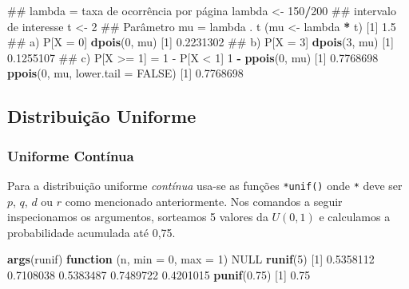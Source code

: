\documentclass[10pt,a4paper]{book}
\newenvironment{Shaded}{\begin{snugshade}}{\end{snugshade}}
\newcommand{\KeywordTok}[1]{\textcolor[rgb]{0.13,0.29,0.53}{\textbf{#1}}}
\newcommand{\DataTypeTok}[1]{\textcolor[rgb]{0.13,0.29,0.53}{#1}}
\newcommand{\DecValTok}[1]{\textcolor[rgb]{0.00,0.00,0.81}{#1}}
\newcommand{\FloatTok}[1]{\textcolor[rgb]{0.00,0.00,0.81}{#1}}
\newcommand{\StringTok}[1]{\textcolor[rgb]{0.31,0.60,0.02}{#1}}
\newcommand{\OtherTok}[1]{\textcolor[rgb]{0.56,0.35,0.01}{#1}}
\newcommand{\ControlFlowTok}[1]{\textcolor[rgb]{0.13,0.29,0.53}{\textbf{#1}}}
\newcommand{\OperatorTok}[1]{\textcolor[rgb]{0.81,0.36,0.00}{\textbf{#1}}}
\newcommand{\NormalTok}[1]{#1}
\begin{document}
\begin{Shaded}
\begin{Highlighting}[]
\NormalTok{## lambda = taxa de ocorrência por página}
\NormalTok{lambda <-}\StringTok{ }\DecValTok{150}\OperatorTok{/}\DecValTok{200}
\NormalTok{## intervalo de interesse}
\NormalTok{t <-}\StringTok{ }\DecValTok{2}
\NormalTok{## Parâmetro mu = lambda . t}
\NormalTok{(mu <-}\StringTok{ }\NormalTok{lambda }\OperatorTok{*}\StringTok{ }\NormalTok{t)}
\NormalTok{[}\DecValTok{1}\NormalTok{] }\FloatTok{1.5}
\NormalTok{## a) P[X = 0]}
\KeywordTok{dpois}\NormalTok{(}\DecValTok{0}\NormalTok{, mu)}
\NormalTok{[}\DecValTok{1}\NormalTok{] }\FloatTok{0.2231302}
\NormalTok{## b) P[X = 3]}
\KeywordTok{dpois}\NormalTok{(}\DecValTok{3}\NormalTok{, mu)}
\NormalTok{[}\DecValTok{1}\NormalTok{] }\FloatTok{0.1255107}
\NormalTok{## c) P[X >= 1] = 1 - P[X < 1]}
\DecValTok{1} \OperatorTok{-}\StringTok{ }\KeywordTok{ppois}\NormalTok{(}\DecValTok{0}\NormalTok{, mu)}
\NormalTok{[}\DecValTok{1}\NormalTok{] }\FloatTok{0.7768698}
\KeywordTok{ppois}\NormalTok{(}\DecValTok{0}\NormalTok{, mu, }\DataTypeTok{lower.tail =} \OtherTok{FALSE}\NormalTok{)}
\NormalTok{[}\DecValTok{1}\NormalTok{] }\FloatTok{0.7768698}
\end{Highlighting}
\end{Shaded}

\subsection{Distribuição Uniforme}\label{distribuicao-uniforme}

\subsubsection{Uniforme Contínua}\label{uniforme-continua}

Para a distribuição uniforme \emph{contínua} usa-se as funções
\texttt{*unif()} onde \texttt{*} deve ser \(p\), \(q\), \(d\) ou \(r\)
como mencionado anteriormente. Nos comandos a seguir inspecionamos os
argumentos, sorteamos 5 valores da \(U(0,1)\) e calculamos a
probabilidade acumulada até 0,75.

\begin{Shaded}
\begin{Highlighting}[]
\KeywordTok{args}\NormalTok{(runif)}
\ControlFlowTok{function}\NormalTok{ (n, }\DataTypeTok{min =} \DecValTok{0}\NormalTok{, }\DataTypeTok{max =} \DecValTok{1}\NormalTok{) }
\OtherTok{NULL}
\KeywordTok{runif}\NormalTok{(}\DecValTok{5}\NormalTok{)}
\NormalTok{[}\DecValTok{1}\NormalTok{] }\FloatTok{0.5358112} \FloatTok{0.7108038} \FloatTok{0.5383487} \FloatTok{0.7489722} \FloatTok{0.4201015}
\KeywordTok{punif}\NormalTok{(}\FloatTok{0.75}\NormalTok{)}
\NormalTok{[}\DecValTok{1}\NormalTok{] }\FloatTok{0.75}
\end{Highlighting}
\end{Shaded}
\end{document}
